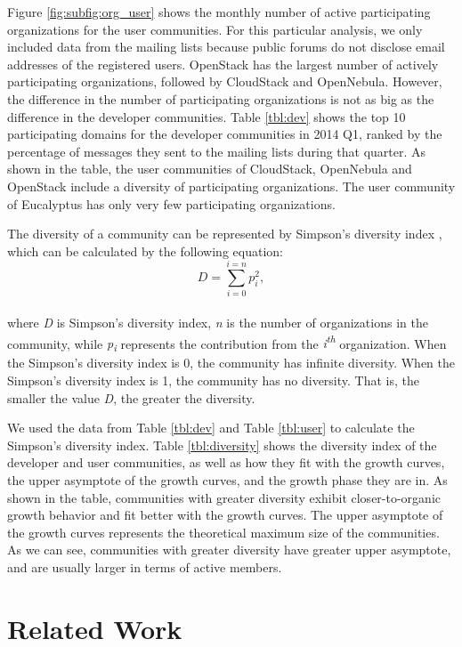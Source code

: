 \documentclass[conference]{IEEEtran}
\begin{document}
Figure \ref{fig:subfig:org_user} shows the monthly number of active participating organizations for the user communities. For this particular analysis, we only included data from the mailing lists because public forums do not disclose email addresses of the registered users. OpenStack has the largest number of actively participating organizations, followed by CloudStack and OpenNebula. However, the difference in the number of participating organizations is not as big as the difference in the developer communities. Table \ref{tbl:dev} shows the top 10 participating domains for the developer communities in 2014 Q1, ranked by the percentage of messages they sent to the mailing lists during that quarter. As shown in the table, the user communities of CloudStack, OpenNebula and OpenStack include a diversity of participating organizations. The user community of Eucalyptus has only very few participating organizations.

The diversity of a community can be represented by Simpson's diversity index \cite{c7}, which can be calculated by the following equation:
\begin{equation}
\label{eq:diversity}
D=\sum_{i=0}^{i=n} p_{i}^{2},
\end{equation}
\\where \textit{D} is Simpson's diversity index, \textit{n} is the number of organizations in the community, while \textit{p\textsubscript{i}} represents the contribution from the \textit{i\textsuperscript{th}} organization. When the Simpson's diversity index is 0, the community has infinite diversity. When the Simpson's diversity index is 1, the community has no diversity. That is, the smaller the value \textit{D}, the greater the diversity. 

We used the data from Table \ref{tbl:dev} and Table \ref{tbl:user} to calculate the Simpson's diversity index. Table \ref{tbl:diversity} shows the diversity index of the developer and user communities, as well as how they fit with the growth curves, the upper asymptote of the growth curves, and the growth phase they are in. As shown in the table, communities with greater diversity exhibit closer-to-organic growth behavior and fit better with the growth curves. The upper asymptote of the growth curves represents the theoretical maximum size of the communities. As we can see, communities with greater diversity have greater upper asymptote, and are usually larger in terms of active members. 


\section{Related Work}
\label{sec:related}
\end{document}
